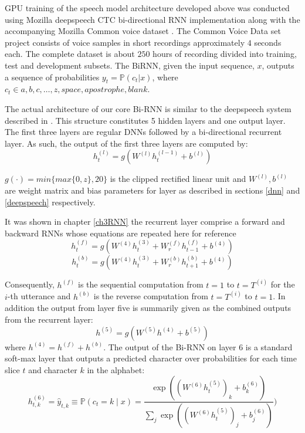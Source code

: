 GPU training of the speech model architecture developed above was conducted using Mozilla deepspeech \citep{ardila2019common} CTC bi-directional RNN implementation along with the accompanying Mozilla Common voice dataset  \citep{mozilla_2019}.  The Common Voice Data set project consists of voice samples in short recordings approximately $4$ seconds each.  The complete dataset is about $250$ hours of recording divided into training, test and development subsets.  The BiRNN, given the input sequence, $x$, outputs a sequence of probabilities $y_t=\mathbb{P}(c_t|x)$,  where $c_t \in a,b,c,\dots,z,space,apostrophe,blank$. 

The actual architecture of our core Bi-RNN is similar to the deepspeech system described in \cite{hannun2014deep}. This structure constitutes 5 hidden layers and one output layer.  The first three layers are regular DNNs followed by a bi-directional recurrent layer. As such, the output of the first three layers are computed by:
\begin{equation}
    h^{(l)}_t = g(W^{(l)} h^{(l−1)}_t + b^{(l)})\label{ch06_01_l1-3}
\end{equation}

$g(\cdot) = min\{max\{0,z\},20\}$  is the clipped rectified linear unit and $W^{(l)},b^{(l)}$ are weight matrix and bias parameters for layer  as described in sections \ref{dnn} and \ref{deepspeech} respectively.

It was shown in chapter \ref{ch3RNN} the recurrent layer comprise a forward and backward RNNs whose equations are repeated here for reference
\begin{equation}
    h^{(f)}_t = g(W^{(4)} h^{(3)}_t + W^{(f)}_r h^{(f)}_{t−1} + b^{(4)})
    \label{ch06_02_fwd}
\end{equation}
\begin{equation}
h^{(b)}_t = g(W^{(4)} h^{(3)}_t + W^{(b)}_r h^{(b)}_{t+1} + b^{(4)})    \label{ch06_03_bwd}
\end{equation}

Consequently, $h^{(f)}$ is the sequential computation from $t=1$ to $t=T^{(i)}$ for the $i$-th utterance and $h^{(b)}$ is the reverse computation from $t=T^{(i)}$ to $t=1$.  In addition the output from layer five is summarily given as the combined outputs from the recurrent layer:
\begin{equation}
h^{(5)} = g(W^{(5)} h^{(4)} + b^{(5)})    \label{ch06_04_l5}
\end{equation}
where $h^{(4)} = h^{(f)} + h^{(b)}$. The output of the Bi-RNN on layer 6 is a standard soft-max layer that outputs a predicted character over probabilities for each time slice $t$ and character $k$ in the alphabet:
\begin{equation}
h^{(6)}_{t,k} = \hat{y}_{t,k} \equiv \mathbb{P}(c_t = k \mid x) = \frac{\exp{ \left( (W^{(6)} h^{(5)}_t)_k + b^{(6)}_k \right)}}{\sum_j \exp{\left( (W^{(6)} h^{(5)}_t)_j + b^{(6)}_j \right)}})    \label{ch06_05_l6}
\end{equation}

